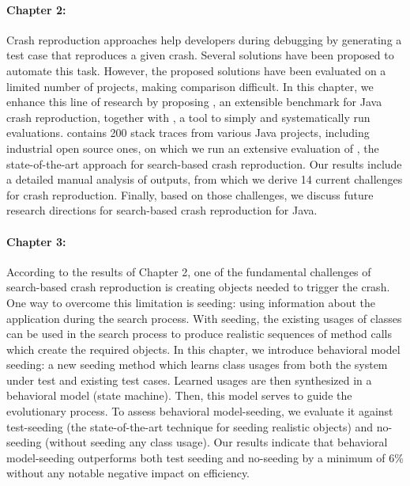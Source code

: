 \paragraph{Chapter 2:}%
Crash reproduction approaches help developers during debugging by generating a test case that reproduces a given crash. 
Several solutions have been proposed to automate this task.
However, the proposed solutions have been evaluated on a limited number of projects, making comparison difficult.
In this chapter, we enhance this line of research by proposing \crashpack, an extensible benchmark for Java crash reproduction, together with \exrunner, a tool to simply and systematically run evaluations.
\crashpack contains 200 stack traces from various Java projects, including industrial open source ones, on which we run an extensive evaluation of \evocrash, the state-of-the-art approach for search-based crash reproduction.
Our results include a detailed manual analysis of \evocrash outputs, from which we derive 14 current challenges for crash reproduction. 
Finally, based on those challenges, we discuss future research directions for search-based crash reproduction for Java.

\paragraph{Chapter 3:}%
According to the results of Chapter 2, one of the fundamental challenges of search-based crash reproduction is creating objects needed to trigger the crash. One way to overcome this limitation is seeding: using information about the application during the search process. With seeding, the existing usages of classes can be used in the search process to produce realistic sequences of method calls which create the required objects. In this chapter, we introduce behavioral model seeding: a new seeding method which learns class usages from both the system under test and existing test cases.  Learned usages are then synthesized in a behavioral model (state machine). Then, this model serves to guide the evolutionary process. To assess behavioral model-seeding, we evaluate it against test-seeding (the state-of-the-art technique for seeding realistic objects) and no-seeding (without seeding any class usage). 
Our results indicate that behavioral model-seeding outperforms both test seeding and no-seeding by a minimum of 6\% without any notable negative impact on efficiency.


